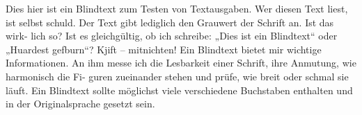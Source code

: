 \documentclass{book}
\begin{document}
\begin{pages}
\begin{Leftside}
\beginnumbering
\pstart
\blindtext

\pend

\pstart
\blindtext
\pend
\endnumbering   
\end{Leftside}

\begin{Rightside}
\beginnumbering
\pstart
Dies hier ist ein Blindtext zum Testen von Textausgaben. Wer diesen Text liest,
ist selbst schuld. Der Text gibt lediglich den Grauwert der Schrift an. Ist das wirk-
lich so? Ist es gleichgültig, ob ich schreibe: „Dies ist ein Blindtext“ oder „Huardest
gefburn“? Kjift – mitnichten! Ein Blindtext bietet mir wichtige Informationen. An
ihm messe ich die Lesbarkeit einer Schrift, ihre Anmutung, wie harmonisch die Fi-
guren zueinander stehen und prüfe, wie breit oder schmal sie läuft. Ein Blindtext
sollte möglichst viele verschiedene Buchstaben enthalten und in der Originalsprache
gesetzt sein.



\pend

\pstart
\blindtext
\pend

\endnumbering
\end{Rightside}
\end{pages}
\Pages
\end{document}
